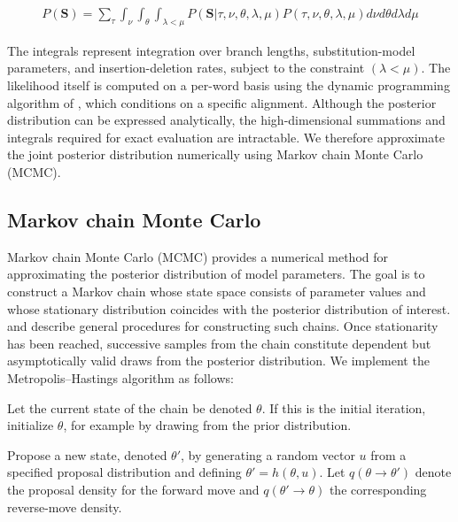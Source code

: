 \documentclass[numsec,webpdf,modern,large,namedate]{oup-authoring-template}
\begin{document}
\begin{align}
\textit{P}(\mathbf{S})= \sum _{\tau }\int _{\nu }\int _{\textit{$\theta$}}\int _{\lambda < \mu }{\textit{P}(\mathbf{S}\vert \tau , \nu , \textit{$\theta$}, \lambda , \mu ) \textit{P}(\tau , \nu , \textit{$\theta$}, \lambda , \mu ) \textit{d}\nu  \textit{d}\textit{$\theta$} \textit{d}\lambda  \textit{d}\mu }
\end{align}

The integrals represent integration over branch lengths, substitution-model parameters, and insertion-deletion rates, subject to the constraint $(\lambda < \mu )$. The likelihood itself is computed on a per-word basis using the dynamic programming algorithm of  \citet{Lunter2003}, which conditions on a specific alignment. Although the posterior distribution can be expressed analytically, the high-dimensional summations and integrals required for exact evaluation are intractable. We therefore approximate the joint posterior distribution numerically using Markov chain Monte Carlo (MCMC). 

\subsection{Markov chain Monte Carlo}
\label{PaperSections_MCMC}
Markov chain Monte Carlo (MCMC) provides a numerical method for approximating the posterior distribution of model parameters. The goal is to construct a Markov chain whose state space consists of parameter values and whose stationary distribution coincides with the posterior distribution of interest.  \citet{Metropolis1953} and  \citet{Hastings1970} describe general procedures for constructing such chains. Once stationarity has been reached, successive samples from the chain constitute dependent but asymptotically valid draws from the posterior distribution. We implement the Metropolis--Hastings algorithm as follows:

Let the current state of the chain be denoted $\textit{$\theta$}$. If this is the initial iteration, initialize $\textit{$\theta$}$, for example by drawing from the prior distribution.

Propose a new state, denoted $\textit{$\theta$}' $, by generating a random vector $u$ from a specified proposal distribution and defining $\textit{$\theta$}' = h(\textit{$\theta$}, u)$. Let $q(\textit{$\theta$}\rightarrow \textit{$\theta$}' )$ denote the proposal density for the forward move and $q(\textit{$\theta$}' \rightarrow \textit{$\theta$})$ the corresponding reverse-move density.
\end{document}
